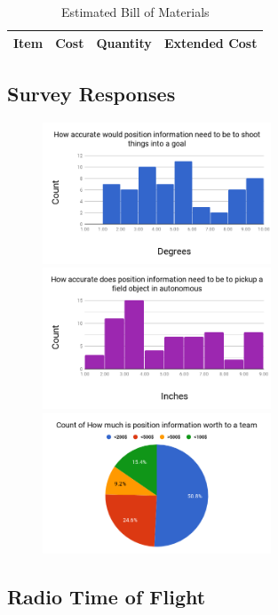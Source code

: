 \documentclass{article}
\begin{document}
    \begin{table}[H]
      \centering
      \begin{tabular}{|c|c|c|c|} \hline
        Item & Cost & Quantity & Extended Cost \\ \hline
      \end{tabular}
      \caption{Estimated Bill of Materials}
      \label{table:beacon_bom}
    \end{table}

  \subsection{Survey Responses}\label{appendix:survey}

    \begin{figure}[H]
      \centering
      \includegraphics[height=4.2cm]{./images/survey_angle.png}
      \includegraphics[height=4.2cm]{./images/survey_position.png}
      \includegraphics[height=4.2cm]{./images/survey_worth.png}
      \label{fig:survey_imgs}
    \end{figure}

  \subsection{Radio Time of Flight}\label{appendix:rf-rx-tx}
\end{document}
